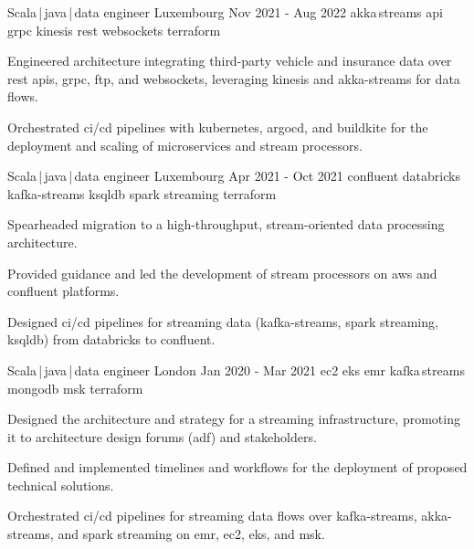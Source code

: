 \begin{cventries}
    \cventry
    {Scala\,|\,java\,|\,data engineer}
    {} %
    {Luxembourg} %
    {Nov 2021 - Aug 2022} %
    {akka\,streams {} api {} grpc {} kinesis {} rest {} websockets {} terraform}
    {
        \begin{cvitems}
            \item{Engineered architecture integrating third-party vehicle and insurance data over rest apis, grpc, ftp, and websockets, leveraging kinesis and akka-streams for data flows.}
            \item{Orchestrated ci/cd pipelines with kubernetes, argocd, and buildkite for the deployment and scaling of microservices and stream processors.}
        \end{cvitems}
    }


    \cventry
    {Scala\,|\,java\,|\,data engineer}
    {} %
    {Luxembourg} %
    {Apr 2021 - Oct 2021} %
    {confluent {} databricks {} kafka-streams {} ksqldb {} spark streaming {} terraform}
    {
        \begin{cvitems}
            \item{Spearheaded migration to a high-throughput, stream-oriented data processing architecture.}
            \item{Provided guidance and led the development of stream processors on aws and confluent platforms.}
            \item{Designed ci/cd pipelines for streaming data (kafka-streams, spark streaming, ksqldb) from databricks to confluent.}
        \end{cvitems}
    }

    \cventry
    {Scala\,|\,java\,|\,data engineer}
    {} %
    {London} %
    {Jan 2020 - Mar 2021} %
    {ec2 {} eks {} emr {} kafka\,streams {} mongodb {} msk {} terraform}
    {
        \begin{cvitems}
            \item{Designed the architecture and strategy for a streaming infrastructure, promoting it to architecture design forums (adf) and stakeholders.}
            \item{Defined and implemented timelines and workflows for the deployment of proposed technical solutions.}
            \item{Orchestrated ci/cd pipelines for streaming data flows over kafka-streams, akka-streams, and spark streaming on emr, ec2, eks, and msk.}
        \end{cvitems}
    }


\end{cventries}
